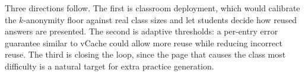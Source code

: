 \documentclass[conference]{IEEEtran}
\begin{document}
Three directions follow. The first is classroom deployment, which would calibrate the $k$-anonymity floor
against real class sizes and let students decide how reused answers are presented. The second is adaptive
thresholds: a per-entry error guarantee similar to vCache \cite{schroeder2025vcache} could allow more reuse
while reducing incorrect reuse. The third is closing the loop, since the page that causes the class most
difficulty is a natural target for extra practice generation.



\end{document}

